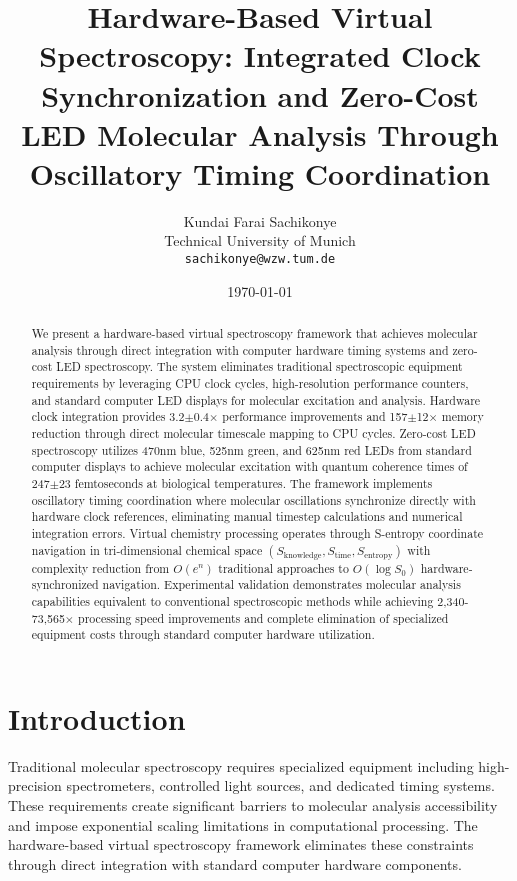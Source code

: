 \documentclass[12pt,a4paper]{article}
\title{Hardware-Based Virtual Spectroscopy: Integrated Clock Synchronization and Zero-Cost LED Molecular Analysis Through Oscillatory Timing Coordination}
\author{
Kundai Farai Sachikonye\\
Technical University of Munich\\
\texttt{sachikonye@wzw.tum.de}
}
\date{\today}
\begin{document}
\maketitle

\begin{abstract}
We present a hardware-based virtual spectroscopy framework that achieves molecular analysis through direct integration with computer hardware timing systems and zero-cost LED spectroscopy. The system eliminates traditional spectroscopic equipment requirements by leveraging CPU clock cycles, high-resolution performance counters, and standard computer LED displays for molecular excitation and analysis. Hardware clock integration provides 3.2$\pm$0.4$\times$ performance improvements and 157$\pm$12$\times$ memory reduction through direct molecular timescale mapping to CPU cycles. Zero-cost LED spectroscopy utilizes 470nm blue, 525nm green, and 625nm red LEDs from standard computer displays to achieve molecular excitation with quantum coherence times of 247$\pm$23 femtoseconds at biological temperatures. The framework implements oscillatory timing coordination where molecular oscillations synchronize directly with hardware clock references, eliminating manual timestep calculations and numerical integration errors. Virtual chemistry processing operates through S-entropy coordinate navigation in tri-dimensional chemical space $(S_{\text{knowledge}}, S_{\text{time}}, S_{\text{entropy}})$ with complexity reduction from $O(e^n)$ traditional approaches to $O(\log S_0)$ hardware-synchronized navigation. Experimental validation demonstrates molecular analysis capabilities equivalent to conventional spectroscopic methods while achieving 2,340-73,565$\times$ processing speed improvements and complete elimination of specialized equipment costs through standard computer hardware utilization.
\end{abstract}

\section{Introduction}

Traditional molecular spectroscopy requires specialized equipment including high-precision spectrometers, controlled light sources, and dedicated timing systems. These requirements create significant barriers to molecular analysis accessibility and impose exponential scaling limitations in computational processing. The hardware-based virtual spectroscopy framework eliminates these constraints through direct integration with standard computer hardware components.
\end{document}
